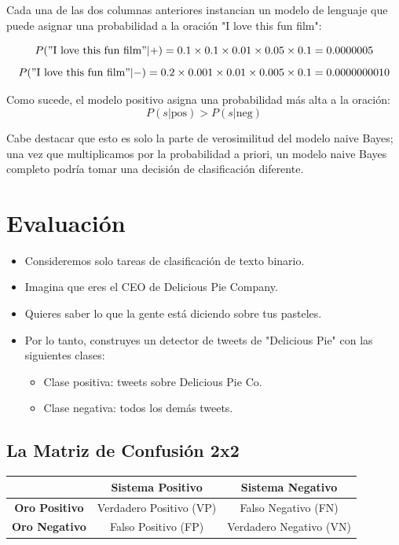 \documentclass[11pt,fleqn]{book} %
\begin{document}
Cada una de las dos columnas anteriores instancian un modelo de lenguaje que puede asignar una probabilidad a la oración "I love this fun film":

\[P("\text{I love this fun film}"|+) = 0.1 \times 0.1 \times 0.01 \times 0.05 \times 0.1 = 0.0000005\]
\[P("\text{I love this fun film}"|-) = 0.2 \times 0.001 \times 0.01 \times 0.005 \times 0.1 = 0.0000000010\]

Como sucede, el modelo positivo asigna una probabilidad más alta a la oración:
\[P(s|\text{pos}) > P(s|\text{neg})\]

Cabe destacar que esto es solo la parte de verosimilitud del modelo naive Bayes; una vez que multiplicamos por la probabilidad a priori, un modelo naive Bayes completo podría tomar una decisión de clasificación diferente.



\section{Evaluación}

\begin{itemize}
 \item Consideremos solo tareas de clasificación de texto binario.
 \item Imagina que eres el CEO de Delicious Pie Company.
 \item Quieres saber lo que la gente está diciendo sobre tus pasteles.
 \item Por lo tanto, construyes un detector de tweets de "Delicious Pie" con las siguientes clases:
\begin{itemize}
\item Clase positiva: tweets sobre Delicious Pie Co.
\item Clase negativa: todos los demás tweets.
\end{itemize}
\end{itemize}



\subsection{La Matriz de Confusión 2x2}
\begin{table}[h]
\centering
\begin{tabular}{|c|c|c|}
\hline
\textbf{} & \textbf{Sistema Positivo} & \textbf{Sistema Negativo} \\
\hline
\textbf{Oro Positivo} & Verdadero Positivo (VP) & Falso Negativo (FN) \\
\hline
\textbf{Oro Negativo} & Falso Positivo (FP) & Verdadero Negativo (VN) \\
\hline
\end{tabular}
\end{table}
\end{document}

